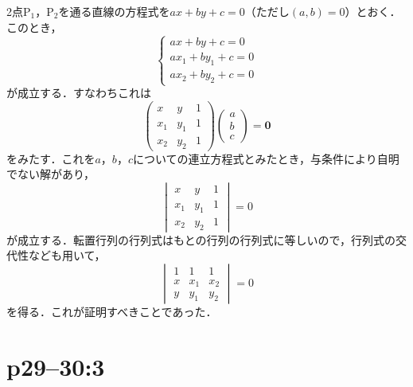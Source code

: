 \begin{tproof}
  2点$\mathrm{P}_1$，$\mathrm{P_2}$を通る直線の方程式を$ax+by+c=0$（ただし$(a,b)=0$）とおく．
  このとき，
  \[
    \begin{cases}
      ax+by+c =0       \\
      ax_1 + by_1 +c=0 \\
      ax_2 + by_2 +c =0
    \end{cases}
  \]
  が成立する．すなわちこれは
  \[
    \begin{pmatrix}
      x   & y   & 1 \\
      x_1 & y_1 & 1 \\
      x_2 & y_2 & 1
    \end{pmatrix}
    \begin{pmatrix}
      a \\
      b \\
      c
    \end{pmatrix}
    = \bm{0}
  \]
  をみたす．これを$a$，$b$，$c$についての連立方程式とみたとき，与条件により自明でない解があり，
  \[
    \begin{vmatrix}
      x   & y   & 1 \\
      x_1 & y_1 & 1 \\
      x_2 & y_2 & 1
    \end{vmatrix}
    =0
  \]
  が成立する．転置行列の行列式はもとの行列の行列式に等しいので，行列式の交代性なども用いて，
  \[
    \begin{vmatrix}
      1 & 1   & 1   \\
      x & x_1 & x_2 \\
      y & y_1 & y_2
    \end{vmatrix}
    =0
  \]
  を得る．これが証明すべきことであった．
\end{tproof}



\section*{p29--30:3}

